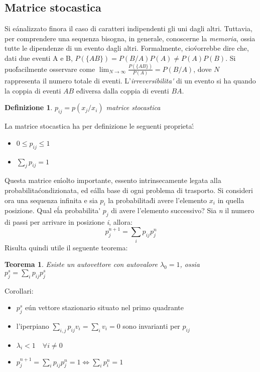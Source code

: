 \documentclass[12pt, a4paper]{book}
\theoremstyle{theorem}
\newtheorem{definition}{Definizione}[section]
\newtheorem{theorem}{Teorema}[section]
\begin{document}
			\subsection{Matrice stocastica}
				Si e\' analizzato finora il caso di caratteri indipendenti gli uni dagli altri.
				Tuttavia, per comprendere una sequenza bisogna, in generale, conoscerne la \textit{memoria}, ossia tutte le dipendenze di un evento dagli altri.
				Formalmente, cio\' vorrebbe dire che, dati due eventi A e B, $P\left(\{AB\}\right)=P\left(B/A\right)P(A)\neq P(A)P(B)$.
				Si puo\' facilmente osservare come $\lim_{N\to\infty}\frac{P\left(\{AB\}\right)}{P(A)}=P\left(B/A\right)$, dove $N$ rappresenta il numero totale di eventi.
				L'\textit{irreversibilita\'} di un evento si ha quando la coppia di eventi $AB$ e\' diversa dalla coppia di eventi $BA$.
				\begin{definition}
					$p_{ij}=p(x_j/x_i)$ matrice stocastica
				\end{definition}
				La matrice stocastica ha per definizione le seguenti proprieta\':
				\begin{itemize}
					\item $0\leq p_{ij}\leq 1$
					\item $\sum_jp_{ij}=1$
				\end{itemize}
				Questa matrice e\' molto importante, essento intrinsecamente legata alla probabilita\' condizionata, ed e\' alla base di ogni problema di trasporto.
				Si consideri ora una sequenza infinita e sia $p_i$ la probabilita\' di avere l'elemento $x_i$ in quella posizione.
				Qual e\' la probabilita\' $p_j$ di avere l'elemento successivo?
				Sia \textit{n} il numero di passi per arrivare in posizione \textit{i}, allora:
				\begin{equation}
					p_j^{n+1}=\sum_ip_{ij}p_j^n
				\end{equation}
				Risulta quindi utile il seguente teorema:
				\begin{theorem}
					Esiste un autovettore con autovalore $\lambda_0=1$, ossia\\
					$p_j^s=\sum_ip_{ij}p_j^s$
				\end{theorem}
				Corollari:
				\begin{itemize}
					\item $p_j^s$ e\' un vettore stazionario situato nel primo quadrante
					\item l'iperpiano $\sum_{i,j}p_{ij}v_i=\sum_iv_i=0$ sono invarianti per $p_{ij}$
					\item $\lambda_i<1\quad\forall i\neq 0$
					\item $p_j^{n+1}=\sum_ip_{ij}p_j^n=1\Leftrightarrow\sum_ip_i^n=1$
				\end{itemize}
\end{document}
